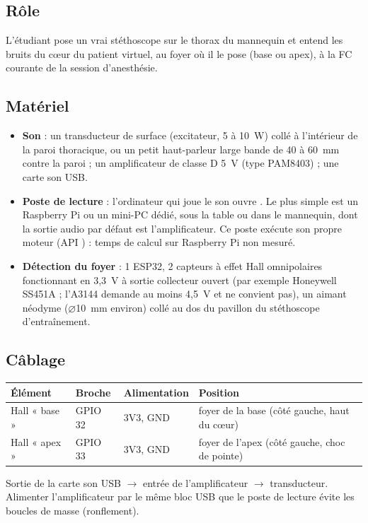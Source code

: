 \documentclass[11pt,a4paper]{article}
\begin{document}
\subsection{Rôle}
L'étudiant pose un vrai stéthoscope sur le thorax du mannequin et entend les bruits du cœur du patient virtuel, au foyer
où il le pose (base ou apex), à la FC courante de la session d'anesthésie.

\subsection{Matériel}
\begin{itemize}
  \item \textbf{Son} : un transducteur de surface (excitateur, 5 à 10~W) collé à l'intérieur de la paroi thoracique,
  ou un petit haut-parleur large bande de 40 à 60~mm contre la paroi ; un amplificateur de classe D 5~V
  (type PAM8403) ; une carte son USB.
  \item \textbf{Poste de lecture} : l'ordinateur qui joue le son ouvre . Le plus simple est un
  Raspberry Pi ou un mini-PC dédié, sous la table ou dans le mannequin, dont la sortie audio par défaut est
  l'amplificateur. Ce poste exécute son propre moteur (API ) : temps de calcul sur Raspberry Pi non mesuré.
  \item \textbf{Détection du foyer} : 1 ESP32, 2 capteurs à effet Hall omnipolaires fonctionnant en 3,3~V à sortie
  collecteur ouvert (par exemple Honeywell SS451A ; l'A3144 demande au moins 4,5~V et ne convient pas), un aimant
  néodyme (\(\varnothing\)10~mm environ) collé au dos du pavillon du stéthoscope d'entraînement.
\end{itemize}

\subsection{Câblage}
\begin{tabularx}{\linewidth}{lllL}
\toprule
\textbf{Élément} & \textbf{Broche} & \textbf{Alimentation} & \textbf{Position} \\
\midrule
Hall « base » & GPIO 32 & 3V3, GND & foyer de la base (côté gauche, haut du cœur) \\
Hall « apex » & GPIO 33 & 3V3, GND & foyer de l'apex (côté gauche, choc de pointe) \\
\bottomrule
\end{tabularx}
Sortie de la carte son USB \(\to\) entrée de l'amplificateur \(\to\) transducteur. Alimenter l'amplificateur par le même
bloc USB que le poste de lecture évite les boucles de masse (ronflement).
\end{document}
